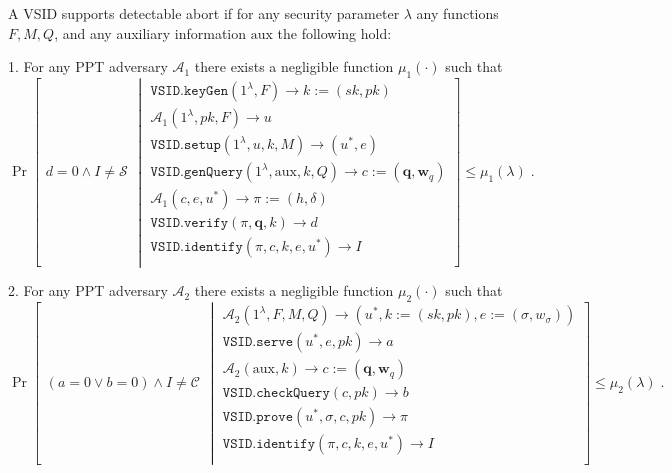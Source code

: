 \begin{definition}\label{def::VSID-Identifiable-Abort}  A  VSID  supports  detectable abort if for any  security parameter $\lambda$ any  functions $F, M,Q$, and any auxiliary information $\text{aux}$ the following hold: 

1. For any PPT adversary $\mathcal{A}_{\scriptscriptstyle 1}$ there exists a negligible function $\mu_{\scriptscriptstyle 1}(\cdot)$ such that
\small{
$$ \Pr\left[
  \begin{array}{l}
 d=0 \wedge I\neq\mathcal{S}
\end{array} \middle |
    \begin{array}{l}
    \mathtt{VSID.keyGen}(1^{\lambda},F)\rightarrow k:=(sk,pk)\\
    \mathcal{A}_{\scriptscriptstyle 1}(1^{\scriptscriptstyle\lambda},pk, F)\rightarrow u\\
    \mathtt{VSID.setup}(1^{\lambda}, u, k, M)\rightarrow (u^{\scriptscriptstyle *},e)\\
    \mathtt{VSID.genQuery}(1^{\lambda},  \text{aux},k,Q)\rightarrow c:=(\bm{q}, \bm{w}_{q})\\
     \mathcal{A}_{\scriptscriptstyle 1}(c,e, u^{\scriptscriptstyle *})\rightarrow \pi:=(h,\delta)\\
     \mathtt{VSID.verify}(\pi,\bm{q},k)\rightarrow d\\
     \mathtt{VSID.identify}(\pi,c,k,e,u^{\scriptscriptstyle *})\rightarrow I\\
\end{array}    \right]\leq \mu_{\scriptscriptstyle 1}(\lambda)\;.$$
}
\normalsize

2. For any PPT adversary $\mathcal{A}_{\scriptscriptstyle 2}$ there exists a negligible function $\mu_{\scriptscriptstyle 2}(\cdot)$ such that
\small{
$$ \Pr\left[
  \begin{array}{l}
 (a=0 \vee b=0)\wedge I\neq\mathcal{C}
\end{array} \middle |
    \begin{array}{l}
    
    \mathcal{A}_{\scriptscriptstyle 2}(1^{\scriptscriptstyle\lambda},F,M,Q)\rightarrow (u^{\scriptscriptstyle *},k:=(sk,pk),e:=(\sigma,w_{\sigma}))\\
    \mathtt{VSID.serve}(u^{\scriptscriptstyle *},e,pk)\rightarrow a\\
       \mathcal{A}_{\scriptscriptstyle 2}(\text{aux},k)\rightarrow c:=(\bm{q},\bm{w}_{\scriptscriptstyle q})\\
    \mathtt{VSID.checkQuery}(c, pk)\rightarrow b\\
    \mathtt{VSID.prove}(u^{\scriptscriptstyle *},\sigma,c,pk)\rightarrow \pi\\
    \mathtt{VSID.identify}(\pi,c,k,e,u^{\scriptscriptstyle *})\rightarrow I\\
\end{array}    \right]\leq \mu_{\scriptscriptstyle 2}(\lambda)\;.$$
}

\end{definition}

